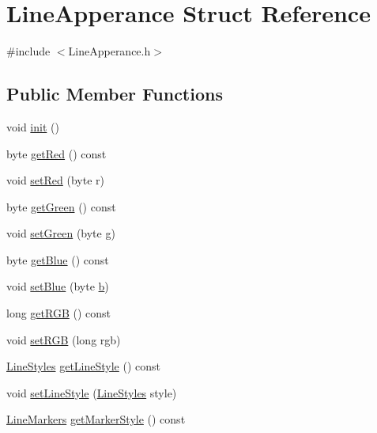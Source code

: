 \hypertarget{struct_line_apperance}{}\section{Line\+Apperance Struct Reference}
\label{struct_line_apperance}


{\ttfamily \#include $<$Line\+Apperance.\+h$>$}

\subsection*{Public Member Functions}
\begin{DoxyCompactItemize}
\item 
void \hyperlink{struct_line_apperance_a34ae106e6365f9e91afca14e174fecab}{init} ()
\item 
byte \hyperlink{struct_line_apperance_a109fe4a87fc054fc79099129a78ff913}{get\+Red} () const 
\item 
void \hyperlink{struct_line_apperance_a03213324a927b014ade4373bb5944b3a}{set\+Red} (byte r)
\item 
byte \hyperlink{struct_line_apperance_a02bd6546b4d57964cb9bd378f0cc2c71}{get\+Green} () const 
\item 
void \hyperlink{struct_line_apperance_a77f7183e8e9da7b9209fdb5e0580aa5a}{set\+Green} (byte g)
\item 
byte \hyperlink{struct_line_apperance_a7af927b62d49e1731f324f22b438634c}{get\+Blue} () const 
\item 
void \hyperlink{struct_line_apperance_af254ae4bc14093b998881665e3b71cb3}{set\+Blue} (byte \hyperlink{_w_d_arduino_lib___unit_tests_8h_adab634951eeadcd5a7c8840eefbf780f}{b})
\item 
long \hyperlink{struct_line_apperance_a553035e24a56d02cf9a168d11c01aec0}{get\+R\+G\+B} () const 
\item 
void \hyperlink{struct_line_apperance_ac7d7604de64a523965aba51b21a10f95}{set\+R\+G\+B} (long rgb)
\item 
\hyperlink{_line_apperance_8h_aeb7e6d7bbe3cf0c8018ad97e75d8e8d9}{Line\+Styles} \hyperlink{struct_line_apperance_add19680a506fa43c3e6cb12cfcf5badc}{get\+Line\+Style} () const 
\item 
void \hyperlink{struct_line_apperance_a040398efa6f1313582ebcbe57f18f2c2}{set\+Line\+Style} (\hyperlink{_line_apperance_8h_aeb7e6d7bbe3cf0c8018ad97e75d8e8d9}{Line\+Styles} style)
\item 
\hyperlink{_line_apperance_8h_a68bf945a0195e285b96ed51e814a6286}{Line\+Markers} \hyperlink{struct_line_apperance_a71a1c86e0cbd58bf22db1f991f270a39}{get\+Marker\+Style} () const 

\end{DoxyCompactItemize}
